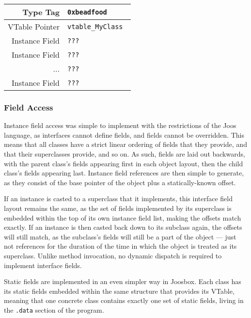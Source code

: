 \documentclass[letterpaper]{article}
\begin{document}
  \begin{center}
  \begin{tabular}{| r | l |}
    \hline
    Type Tag & {\tt 0xbeadfood } \\ \hline
    VTable Pointer & {\tt vtable\_MyClass } \\ \hline
    Instance Field & {\tt ??? } \\ 
    Instance Field & {\tt ??? } \\ 
    ... & {\tt ??? } \\ 
    Instance Field & {\tt ??? } \\ \hline
  \end{tabular}
\end{center}

  \subsubsection{Field Access}

  Instance field access was simple to implement with the restrictions of the Joos
  language, as interfaces cannot define fields, and fields cannot be overridden.
  This means that all classes have a strict linear ordering of fields that they
  provide, and that their superclasses provide, and so on. As such, fields are laid
  out backwards, with the parent class's fields appearing first in each object layout,
  then the child class's fields appearing last. Instance field references are then
  simple to generate, as they consist of the base pointer of the object plus a statically-known offset.

  If an instance is casted to a superclass that it implements, this interface
  field layout remains the same, as the set of fields implemented by its
  superclass is embedded within the top of its own instance field list, making
  the offsets match exactly. If an instance is then casted back down to its
  subclass again, the offsets will still match, as the subclass's fields will
  still be a part of the object --- just not references for the duration of
  the time in which the object is treated as its superclass. Unlike method invocation,
  no dynamic dispatch is required to implement interface fields.

  Static fields are implemented in an even simpler way in Joosbox.
  Each class has its static fields embedded within the same structure that
  provides its VTable, meaning that one concrete class contains exactly one set
  of static fields, living in the {\tt .data} section of the program.
\end{document}
